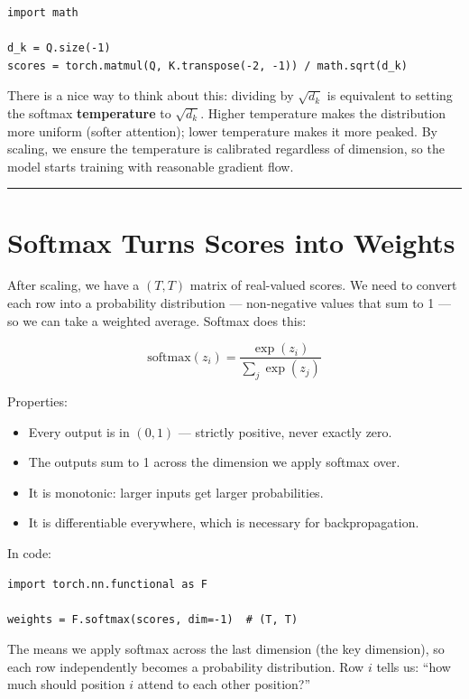 \demotag
\begin{lstlisting}
import math

d_k = Q.size(-1)
scores = torch.matmul(Q, K.transpose(-2, -1)) / math.sqrt(d_k)
\end{lstlisting}

There is a nice way to think about this: dividing by $\sqrt{d_k}$ is equivalent to setting the softmax \textbf{temperature} to $\sqrt{d_k}$. Higher temperature makes the distribution more uniform (softer attention); lower temperature makes it more peaked. By scaling, we ensure the temperature is calibrated regardless of dimension, so the model starts training with reasonable gradient flow.

\bigskip\hrule\bigskip

\section{Softmax Turns Scores into Weights}

After scaling, we have a $(T, T)$ matrix of real-valued scores. We need to convert each row into a probability distribution --- non-negative values that sum to 1 --- so we can take a weighted average. Softmax does this:

\[
\mathrm{softmax}(z_i) = \frac{\exp(z_i)}{\sum_j \exp(z_j)}
\]

Properties:
\begin{itemize}
  \item Every output is in $(0, 1)$ --- strictly positive, never exactly zero.
  \item The outputs sum to 1 across the dimension we apply softmax over.
  \item It is monotonic: larger inputs get larger probabilities.
  \item It is differentiable everywhere, which is necessary for backpropagation.
\end{itemize}

In code:

\demotag
\begin{lstlisting}
import torch.nn.functional as F

weights = F.softmax(scores, dim=-1)  # (T, T)
\end{lstlisting}

The  means we apply softmax across the last dimension (the key dimension), so each row independently becomes a probability distribution. Row $i$ tells us: ``how much should position $i$ attend to each other position?''

